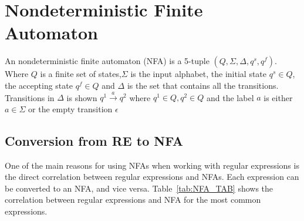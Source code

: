 \section{Nondeterministic Finite Automaton}
\begin{mydef}
An nondeterministic finite automaton (NFA) is a 5-tuple $(Q,\Sigma,\Delta,q^s ,q^f)$. Where $Q$ is a finite set of states,$\Sigma$ is the input alphabet, the initial state $q^s \in Q$,  the accepting state $q^f \in Q$ and $\Delta$ is the set that contains all the transitions. Transitions in $\Delta$ is shown $q^1\xrightarrow{a}q^2$ where $q^1\in Q,q^2\in Q$ and the label $a$ is either $a \in \Sigma$ or  the empty transition $\epsilon$
\end{mydef}

\subsection{Conversion from RE to NFA}
\label{RA_TO_NFA}
One of the main reasons for using NFAs when working with regular expressions is the direct correlation between regular expressions and NFAs. Each expression can be converted to an NFA, and vice versa. Table~\ref{tab:NFA_TAB} shows the correlation between regular expressions and NFA for the most common expressions.

